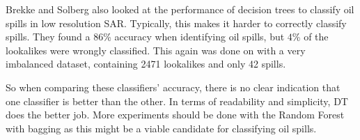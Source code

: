 Brekke and Solberg also looked at the performance of decision trees to classify oil spills in low resolution SAR. Typically, this makes it harder to correctly classify spills. They found a $86$\% accuracy when identifying oil spills, but $4$\% of the lookalikes were wrongly classified. This again was done on with a very imbalanced dataset, containing 2471 lookalikes and only 42 spills.

So when comparing these classifiers' accuracy, there is no clear indication that one classifier is better than the other. In terms of readability and simplicity, DT does the better job. More experiments should be done with the Random Forest with bagging as this might be a viable candidate for classifying oil spills.